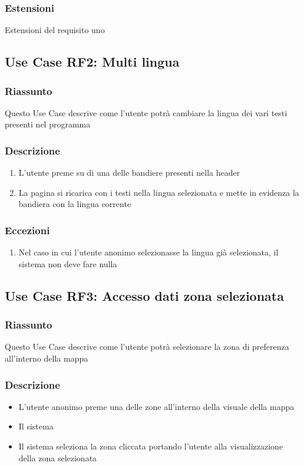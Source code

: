         \subsubsection{Estensioni}
            Estensioni del requisito uno    %

    \subsection{Use Case {RF2}: Multi lingua}
        \subsubsection{Riassunto}
            Questo Use Case descrive come l'utente potrà cambiare la lingua dei vari testi presenti nel programma
        \subsubsection{Descrizione}
            \begin{enumerate}
                \item L'utente preme su di una delle bandiere presenti nella header
                \item La pagina si ricarica con i testi nella lingua selezionata e mette in evidenza la bandiera con la lingua corrente
            \end{enumerate}
        \subsubsection{Eccezioni}
            \begin{enumerate}
                \item Nel caso in cui l'utente anonimo selezionasse la lingua già selezionata, il sistema non deve fare nulla 
            \end{enumerate}

    \subsection{Use Case {RF3}: Accesso dati zona selezionata}
        \subsubsection{Riassunto}
            Questo Use Case descrive come l'utente potrà selezionare la zona di preferenza all'interno della mappa
        \subsubsection{Descrizione}
        \begin{itemize}
            \item L'utente anonimo preme una delle zone all'interno della visuale della mappa
            \item Il sistema 
            \item Il sistema seleziona la zona cliccata portando l'utente alla visualizzazione della zona selezionata
        \end{itemize}

